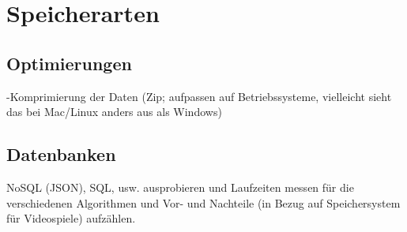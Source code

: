 \chapter{Speicherarten}\label{ch:speicherarten}

\section{Optimierungen}
-Komprimierung der Daten (Zip; aufpassen auf Betriebssysteme, vielleicht sieht das bei Mac/Linux anders aus als Windows)

\section{Datenbanken}
NoSQL (JSON), SQL, usw. ausprobieren und Laufzeiten messen für die verschiedenen Algorithmen und Vor- und Nachteile (in Bezug auf Speichersystem für Videospiele) aufzählen.
